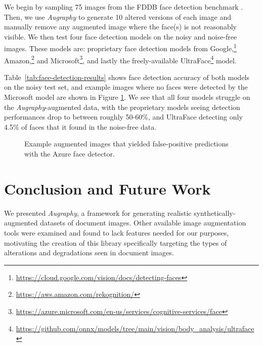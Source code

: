 \documentclass[runningheads]{llncs}
\begin{document}
We begin by sampling 75 images from the FDDB face detection benchmark \cite{fddbTech}.
Then, we use \emph{Augraphy} to generate 10 altered versions of each image and manually remove any augmented image where the face(s) is not reasonably visible.
We then test four face detection models on the noisy and noise-free images.
These models are: proprietary face detection models from Google,\footnote{\url{https://cloud.google.com/vision/docs/detecting-faces}} Amazon,\footnote{\url{https://aws.amazon.com/rekognition/}} and Microsoft\footnote{\url{https://azure.microsoft.com/en-us/services/cognitive-services/face}}, and lastly the freely-available UltraFace\footnote{\url{https://github.com/onnx/models/tree/main/vision/body_analysis/ultraface}} model.

Table~\ref{tab:face-detection-results} shows face detection accuracy of both models on the noisy test set, and example images where no faces were detected by the Microsoft model are shown in Figure \ref{fig:face-detection-mistakes}.
We see that all four models struggle on the \emph{Augraphy}-augmented data, with the proprietary models seeing detection performances drop to between roughly 50-60\%, and UltraFace detecting only 4.5\% of faces that it found in the noise-free data.

\begin{figure}
    \centering{}
    \caption{Example augmented images that yielded false-positive predictions with the Azure face detector.}
    \label{fig:face-detection-mistakes}
\end{figure}


\section{Conclusion and Future Work}
We presented \emph{Augraphy}, a framework for generating realistic synthetically-augmented datasets of document images.
Other available image augmentation tools were examined and found to lack features needed for our purposes, motivating the creation of this library specifically targeting the types of alterations and degradations seen in document images.
\end{document}

